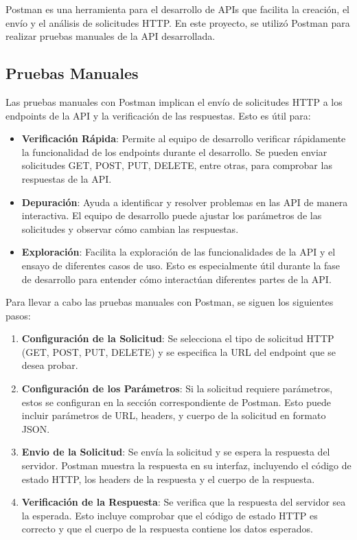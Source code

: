 Postman es una herramienta para el desarrollo de APIs que facilita la creación, el envío y el análisis de solicitudes HTTP. En este proyecto, se utilizó Postman para realizar pruebas manuales de la API desarrollada.

\subsection{Pruebas Manuales}
Las pruebas manuales con Postman implican el envío de solicitudes HTTP a los endpoints de la API y la verificación de las respuestas. Esto es útil para:
\begin{itemize}
    \item \textbf{Verificación Rápida}: Permite al equipo de desarrollo verificar rápidamente la funcionalidad de los endpoints durante el desarrollo. Se pueden enviar solicitudes GET, POST, PUT, DELETE, entre otras, para comprobar las respuestas de la API.
    \item \textbf{Depuración}: Ayuda a identificar y resolver problemas en las API de manera interactiva. El equipo de desarrollo puede ajustar los parámetros de las solicitudes y observar cómo cambian las respuestas.
    \item \textbf{Exploración}: Facilita la exploración de las funcionalidades de la API y el ensayo de diferentes casos de uso. Esto es especialmente útil durante la fase de desarrollo para entender cómo interactúan diferentes partes de la API.
\end{itemize}

Para llevar a cabo las pruebas manuales con Postman, se siguen los siguientes pasos:

\begin{enumerate}
    \item \textbf{Configuración de la Solicitud}: Se selecciona el tipo de solicitud HTTP (GET, POST, PUT, DELETE) y se especifica la URL del endpoint que se desea probar.
    \item \textbf{Configuración de los Parámetros}: Si la solicitud requiere parámetros, estos se configuran en la sección correspondiente de Postman. Esto puede incluir parámetros de URL, headers, y cuerpo de la solicitud en formato JSON.
    \item \textbf{Envio de la Solicitud}: Se envía la solicitud y se espera la respuesta del servidor. Postman muestra la respuesta en su interfaz, incluyendo el código de estado HTTP, los headers de la respuesta y el cuerpo de la respuesta.
    \item \textbf{Verificación de la Respuesta}: Se verifica que la respuesta del servidor sea la esperada. Esto incluye comprobar que el código de estado HTTP es correcto y que el cuerpo de la respuesta contiene los datos esperados.
\end{enumerate}
 
